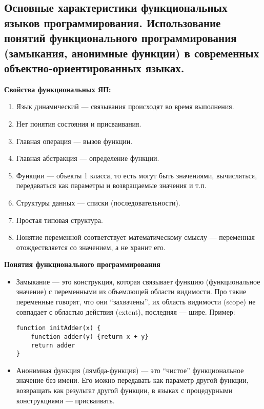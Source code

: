 \subsection{Основные  характеристики  функциональных  языков  программирования.  Использование  понятий функционального  программирования  (замыкания,  анонимные функции)  в  современных  объектно-ориентированных языках.}

\textbf{Свойства функциональных ЯП:}
\begin{enumerate}
    \item Язык динамический --- связывания происходят во время выполнения.
    \item Нет понятия состояния и присваивания.
    \item Главная операция --- вызов функции.
    \item Главная абстракция --- определение функции.
    \item Функции --- объекты 1 класса, то есть могут быть значениями, вычисляться, передаваться как параметры и возвращаемые значения и т.п.
    \item Структуры данных --- списки (последовательности).
    \item Простая типовая структура.
    \item Понятие переменной соответствует математическому смыслу --- переменная отождествляется со значением, а не хранит его.
\end{enumerate}

\textbf{Понятия функционального программирования}

\begin{itemize}
    \item Замыкание --- это конструкция, которая связывает функцию (функциональное значение) с переменными из объемлющей области видимости.
    Про такие переменные говорят, что они ``захвачены'', их область видимости (scope) не совпадает с областью действия (extent), последняя --- шире.
    Пример:
    \begin{lstlisting}
function initAdder(x) {
    function adder(y) {return x + y}
    return adder
}
    \end{lstlisting}
    \item Анонимная функция (лямбда-функция) --- это ``чистое'' функциональное значение без имени. 
    Его можно передавать как параметр другой функции, возвращать как результат другой функции, в языках с процедурными конструкциями --- присваивать.
\end{itemize}

